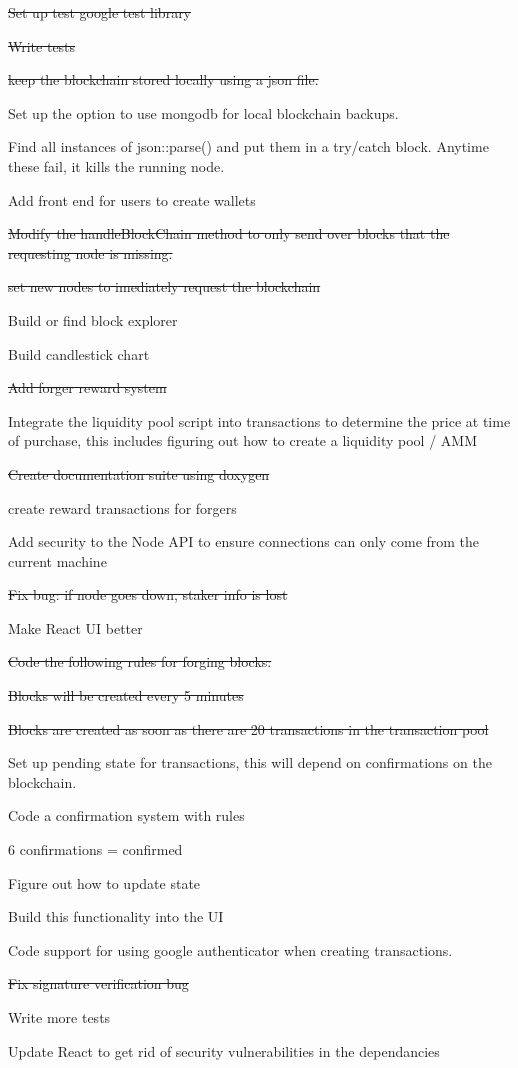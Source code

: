 
\begin{DoxyItemize}
\item \sout{Set up test google test library}
\item \sout{Write tests}
\item \sout{keep the blockchain stored locally using a json file.}
\item Set up the option to use mongodb for local blockchain backups.
\item Find all instances of json\+::parse() and put them in a try/catch block. Anytime these fail, it kills the running node.
\item Add front end for users to create wallets
\item \sout{Modify the handle\+Block\+Chain method to only send over blocks that the requesting node is missing.}
\item \sout{set new nodes to imediately request the blockchain}
\item Build or find block explorer
\item Build candlestick chart
\item \sout{Add forger reward system}
\item Integrate the liquidity pool script into transactions to determine the price at time of purchase, this includes figuring out how to create a liquidity pool / AMM
\item \sout{Create documentation suite using doxygen}
\item create reward transactions for forgers
\item Add security to the Node API to ensure connections can only come from the current machine
\item \sout{Fix bug\+: if node goes down, staker info is lost}
\item Make React UI better
\item \sout{Code the following rules for forging blocks\+:}
\begin{DoxyItemize}
\item \sout{Blocks will be created every 5 minutes}
\item \sout{Blocks are created as soon as there are 20 transactions in the transaction pool}
\end{DoxyItemize}
\item Set up pending state for transactions, this will depend on confirmations on the blockchain.
\item Code a confirmation system with rules
\begin{DoxyItemize}
\item 6 confirmations = confirmed
\item Figure out how to update state
\item Build this functionality into the UI
\end{DoxyItemize}
\item Code support for using google authenticator when creating transactions.
\item \sout{Fix signature verification bug}
\item Write more tests
\item Update React to get rid of security vulnerabilities in the dependancies 
\end{DoxyItemize}
